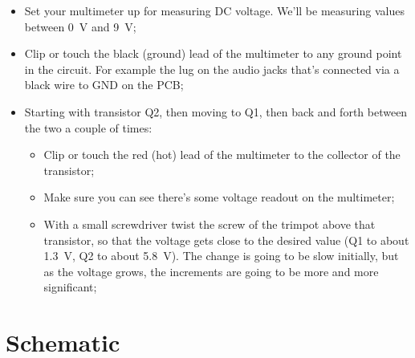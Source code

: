 \documentclass[a4paper,12pt]{article}
\begin{document}
\begin{itemize}
  \item Set your multimeter up for measuring DC voltage.
    We'll be measuring values between \SI{0}{\V} and
    \SI{9}{\V};

  \item Clip or touch the black (ground) lead of the
    multimeter to any ground point in the circuit. For
    example the lug on the audio jacks that's connected via
    a black wire to GND on the PCB;

  \item Starting with transistor Q2, then moving to Q1, then
    back and forth between the two a couple of times:

    \begin{itemize}
      \item Clip or touch the red (hot) lead of the
        multimeter to the collector of the transistor;

      \item Make sure you can see there's some voltage
        readout on the multimeter;

      \item With a small screwdriver twist the screw of the
        trimpot above that transistor, so that the voltage
        gets close to the desired value (Q1 to about
        \SI{1.3}{\V}, Q2 to about \SI{5.8}{\V}). The change
        is going to be slow initially, but as the voltage
        grows, the increments are going to be more and more
        significant;
    \end{itemize}

\end{itemize}


\section{Schematic}
\label{sec:schematic}


\newgeometry{}
\restoregeometry{}

\begin{versionhistory}
\end{versionhistory}
\end{document}
